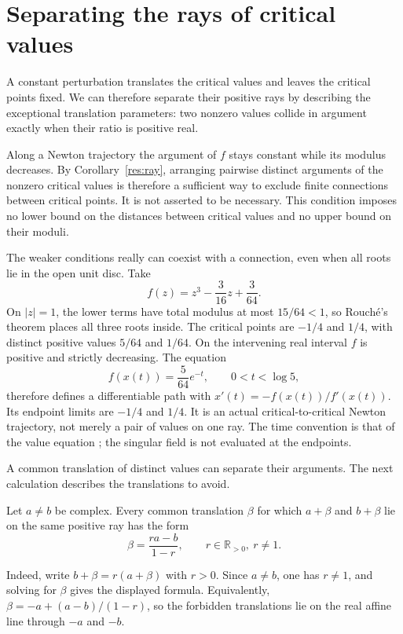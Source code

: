 \documentclass[11pt]{article}
\begin{document}
\section{Separating the rays of critical values}\label{sec:arguments}

A constant perturbation translates the critical values and leaves the
critical points fixed. We can therefore separate their positive rays
by describing the exceptional translation parameters: two nonzero
values collide in argument exactly when their ratio is positive real.

Along a Newton trajectory the argument of $f$ stays constant while its
modulus decreases. By Corollary~\ref{res:ray}, arranging pairwise distinct
arguments of the nonzero critical values is therefore a sufficient way
to exclude finite connections between critical points. It is not asserted
to be necessary. This condition imposes no lower bound on the distances
between critical values and no upper bound on their moduli.

The weaker conditions really can coexist with a connection, even when
all roots lie in the open unit disc. Take
\[
 f(z)=z^3-\frac3{16}z+\frac3{64}.
\]
On $|z|=1$, the lower terms have total modulus at most $15/64<1$, so
Rouch\'e's theorem places all three roots inside. The critical points
are $-1/4$ and $1/4$, with distinct positive values $5/64$ and $1/64$.
On the intervening real interval $f$ is positive and strictly decreasing.
The equation
\[
 f(x(t))=\frac5{64}e^{-t},\qquad 0<t<\log5,
\]
therefore defines a differentiable path with
$x'(t)=-f(x(t))/f'(x(t))$. Its endpoint limits are $-1/4$ and $1/4$.
It is an actual critical-to-critical Newton trajectory, not merely a
pair of values on one ray. The time convention is that of the value
equation \cite[Lemma~2.1]{kozen-stefansson1997}; the singular field is
not evaluated at the endpoints.

A common translation of distinct values can separate their arguments.
The next calculation describes the translations to avoid.

\begin{theorem}\label{res:locus}
Let $a\ne b$ be complex.  Every common translation $\beta$ for which $a+\beta$
and $b+\beta$ lie on the same positive ray has the form
\[
  \beta=\frac{ra-b}{1-r},
  \qquad r\in\mathbb{R}_{>0},\ r\ne1 .
\]
\end{theorem}

Indeed, write $b+\beta=r(a+\beta)$ with $r>0$. Since $a\ne b$,
one has $r\ne1$, and solving for $\beta$ gives the displayed formula.
Equivalently, $\beta=-a+(a-b)/(1-r)$, so the forbidden translations
lie on the real affine line through $-a$ and $-b$.
\end{document}
